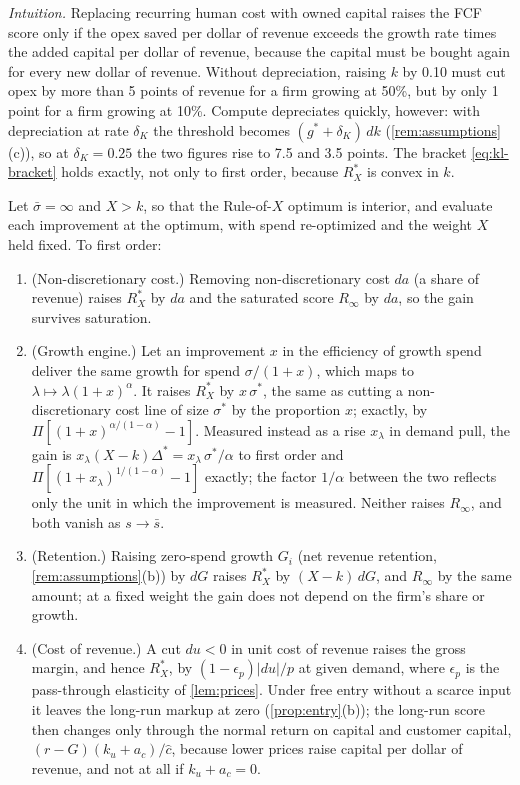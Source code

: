 \noindent\emph{Intuition.} Replacing recurring human cost with owned capital raises the FCF score only if the opex saved per dollar of revenue exceeds the growth rate times the added capital per dollar of revenue, because the capital must be bought again for every new dollar of revenue. Without depreciation, raising $k$ by 0.10 must cut opex by more than 5 points of revenue for a firm growing at 50\%, but by only 1 point for a firm growing at 10\%. Compute depreciates quickly, however: with depreciation at rate $\delta_K$ the threshold becomes $(g^*+\delta_K)\,dk$ (\autoref{rem:assumptions}(c)), so at $\delta_K=0.25$ the two figures rise to 7.5 and 3.5 points. The bracket \eqref{eq:kl-bracket} holds exactly, not only to first order, because $R_X^*$ is convex in $k$.

\begin{corollary}\label{cor:priorities}
Let $\bar\sigma=\infty$ and $X>k$, so that the Rule-of-$X$ optimum is interior, and evaluate each improvement at the optimum, with spend re-optimized and the weight $X$ held fixed. To first order:
\begin{enumerate}
\item[(i)] (Non-discretionary cost.) Removing non-discretionary cost $da$ (a share of revenue) raises $R_X^*$ by $da$ and the saturated score $R_\infty$ by $da$, so the gain survives saturation.
\item[(ii)] (Growth engine.) Let an improvement $x$ in the efficiency of growth spend deliver the same growth for spend $\sigma/(1+x)$, which maps to $\lambda\mapsto\lambda(1+x)^{\alpha}$. It raises $R_X^*$ by $x\,\sigma^*$, the same as cutting a non-discretionary cost line of size $\sigma^*$ by the proportion $x$; exactly, by $\Pi[(1+x)^{\alpha/(1-\alpha)}-1]$. Measured instead as a rise $x_\lambda$ in demand pull, the gain is $x_\lambda(X-k)\Delta^*=x_\lambda\,\sigma^*/\alpha$ to first order and $\Pi[(1+x_\lambda)^{1/(1-\alpha)}-1]$ exactly; the factor $1/\alpha$ between the two reflects only the unit in which the improvement is measured. Neither raises $R_\infty$, and both vanish as $s\to\bar s$.
\item[(iii)] (Retention.) Raising zero-spend growth $G_i$ (net revenue retention, \autoref{rem:assumptions}(b)) by $dG$ raises $R_X^*$ by $(X-k)\,dG$, and $R_\infty$ by the same amount; at a fixed weight the gain does not depend on the firm's share or growth.
\item[(iv)] (Cost of revenue.) A cut $du<0$ in unit cost of revenue raises the gross margin, and hence $R_X^*$, by $(1-\epsilon_p)|du|/p$ at given demand, where $\epsilon_p$ is the pass-through elasticity of \autoref{lem:prices}. Under free entry without a scarce input it leaves the long-run markup at zero (\autoref{prop:entry}(b)); the long-run score then changes only through the normal return on capital and customer capital, $(r-G)(k_u+a_c)/\hat c$, because lower prices raise capital per dollar of revenue, and not at all if $k_u+a_c=0$.

\end{enumerate}
\end{corollary}
